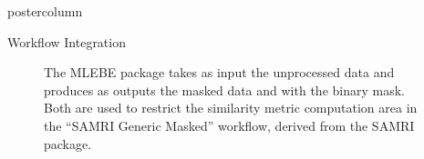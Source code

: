 \begin{frame}
\begin{columns}
\begin{column}{.42\textwidth}
\begin{beamercolorbox}[center]{postercolumn}
\begin{minipage}{.98\textwidth}
{\begin{myblock}{Workflow Integration}
                                \vspace{-1em}

                                \begin{figure}
                                    \centering
                                    \caption{
                                        The \textcolor{lg}{MLEBE} package takes as input the unprocessed data and produces as outputs the masked data and  with the binary mask.
                                        Both are used to restrict the similarity metric computation area in the “SAMRI Generic Masked” workflow, derived from the \textcolor{lg}{SAMRI} \cite{irsabi} package.
                                    }
                                \end{figure}
                            \end{myblock}\vfill

}
\end{minipage}
\end{beamercolorbox}
\end{column}
\end{columns}
\end{frame}
